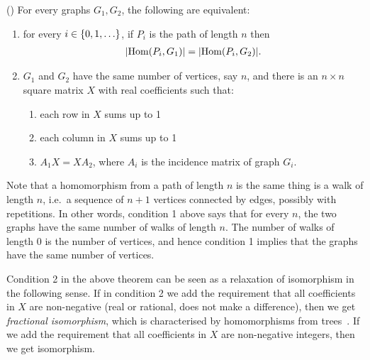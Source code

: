 \begin{theorem}\label{thm:grohe}(\cite[Theorem 2]{groheDellRattan2018})
    For every  graphs $G_1,G_2$, the following  are equivalent:
    \begin{enumerate}
        \item for every $i \in \{0,1,\ldots\}$, if $P_i$ is the path of length $n$ then
        \begin{align*}
        |\mathrm {Hom}(P_i,G_1) | = |\mathrm {Hom}(P_i,G_2)|.
        \end{align*}
        \item $G_1$ and $G_2$  have the same number of vertices, say $n$, and there is an $n \times n$ square matrix $X$ with real coefficients such that:
        \begin{enumerate}
            \item each row in $X$ sums up to 1
            \item each column in $X$ sums up to 1
            \item $A_1 X = X A_2$, where $A_i$ is the incidence matrix of graph $G_i$.
        \end{enumerate}
    \end{enumerate}
\end{theorem}
Note that a homomorphism from a path of length $n$ is the same thing is a walk of length $n$, i.e.~a sequence of $n+1$ vertices connected by edges, possibly with repetitions.  In other words, condition 1 above says that for every $n$, the two graphs have the same number of walks of length $n$. The number of walks of length 0 is the number of vertices, and hence condition 1 implies that the graphs have the same number of vertices.     

Condition 2 in the above theorem can be seen as a relaxation of isomorphism in the following sense. 
If in condition 2 we add the requirement that all coefficients in $X$ are non-negative (real or rational, does not make a difference), then we get  \emph{fractional isomorphism}, which is characterised by homomorphisms from trees~\cite[Theorem 1]{groheDellRattan2018}. If we add the requirement that all coefficients in $X$ are non-negative integers, then we get isomorphism.  

